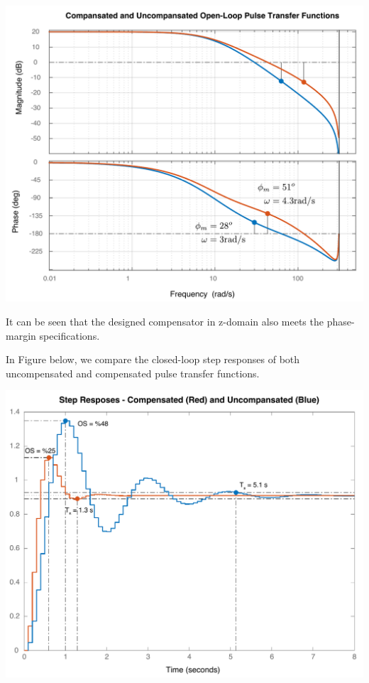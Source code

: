 \documentclass[twoside]{article}
\begin{document}
\begin{enumerate}
\begin{center}
\begin{minipage}[h]{\linewidth}
\begin{center}
       \includegraphics[width=\textwidth]{DTlead}
     \end{center}
 \end{minipage}
     \end{center}
%
It can be seen that the designed compensator in z-domain
also meets the phase-margin specifications.
%
\end{enumerate}

\newpage

In Figure below, we compare the closed-loop step responses
of both uncompensated and compensated pulse transfer functions.
%
     \begin{center}
 \begin{minipage}[h]{0.7\linewidth}
     \begin{center}
       \includegraphics[width=\textwidth]{step}
     \end{center}
 \end{minipage}
     \end{center}
%

\end{document}
